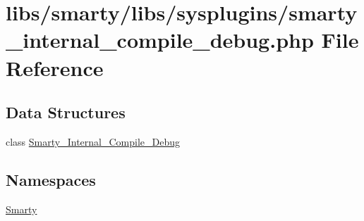 \hypertarget{smarty__internal__compile__debug_8php}{}\section{libs/smarty/libs/sysplugins/smarty\+\_\+internal\+\_\+compile\+\_\+debug.php File Reference}
\label{smarty__internal__compile__debug_8php}
\subsection*{Data Structures}
\begin{DoxyCompactItemize}
\item 
class \hyperlink{class_smarty___internal___compile___debug}{Smarty\+\_\+\+Internal\+\_\+\+Compile\+\_\+\+Debug}
\end{DoxyCompactItemize}
\subsection*{Namespaces}
\begin{DoxyCompactItemize}
\item 
 \hyperlink{namespace_smarty}{Smarty}
\end{DoxyCompactItemize}
